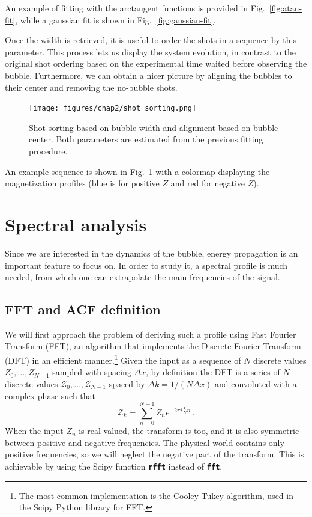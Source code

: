 An example of fitting with the arctangent functions is provided in Fig.\ \ref{fig:atan-fit}, while a gaussian fit is shown in Fig.\ \ref{fig:gaussian-fit}.

Once the width is retrieved, it is useful to order the shots in a sequence by this parameter. This process lets us display the system evolution, in contrast to the original shot ordering based on the experimental time waited before observing the bubble. Furthermore, we can obtain a nicer picture by aligning the bubbles to their center and removing the no-bubble shots.
\begin{figure}[h!]
    \centering
    \texttt{[image: figures/chap2/shot\_sorting.png]}
    \caption{Shot sorting based on bubble width and alignment based on bubble center. Both parameters are estimated from the previous fitting procedure.}
    \label{fig:sorting}
\end{figure}
An example sequence is shown in Fig.\ \ref{fig:sorting} with a colormap displaying the magnetization profiles (blue is for positive $Z$ and red for negative $Z$).

\section{Spectral analysis}
Since we are interested in the dynamics of the bubble, energy propagation is an important feature to focus on. In order to study it, a spectral profile is much needed, from which one can extrapolate the main frequencies of the signal. 

\subsection{FFT and ACF definition}
We will first approach the problem of deriving such a profile using Fast Fourier Transform (FFT), an algorithm that implements the Discrete Fourier Transform (DFT) in an efficient manner.\footnote{The most common implementation is the Cooley-Tukey algorithm, used in the Scipy Python library for FFT.} Given the input as a sequence of $N$ discrete values $Z_0,\dots,Z_{N-1}$ sampled with spacing $\Delta x$, by definition the DFT is a series of $N$ discrete values $\mathcal{Z}_0,\dots,\mathcal{Z}_{N-1}$ spaced by $\Delta k = 1/(N\Delta x)$ and convoluted with a complex phase such that
\begin{equation*}
    \mathcal{Z}_k = \sum_{n=0}^{N-1} Z_n e^{-2\pi i \frac{k}{N}n}\, .
\end{equation*}
When the input $Z_n$ is real-valued, the transform is too, and it is also symmetric between positive and negative frequencies. The physical world contains only positive frequencies, so we will neglect the negative part of the transform. This is achievable by using the Scipy function \texttt{\textbf{rfft}} instead of \texttt{\textbf{fft}}.

